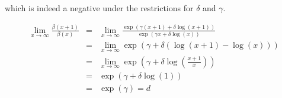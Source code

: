 \documentclass[11pt]{article}
\begin{document}
which is indeed a negative under the restrictions for $\delta$ and $\gamma$.

\begin{eqnarray}
\lim_{x \to \infty} \frac{\beta(x+1)}{\beta(x)} &=& \lim_{x \to \infty} \frac{\exp(\gamma (x+1) + \delta \log(x+1))}{\exp(\gamma x + \delta \log(x))} \\
&=& \lim_{x \to \infty}  \exp(\gamma + \delta(\log(x+1) - \log(x))) \\
&=& \lim_{x \to \infty}  \exp(\gamma + \delta\log\left(\frac{x+1}{x}\right)) \\
&=&\exp(\gamma + \delta\log\left(1\right)) \\
&=&\exp(\gamma) = d
\end{eqnarray}
\end{document}
